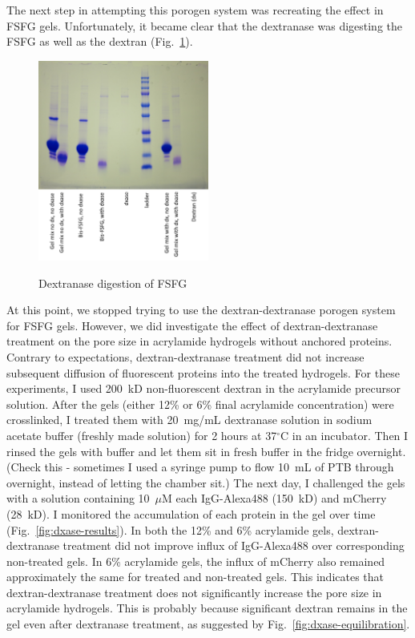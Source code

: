 The next step in attempting this porogen system was recreating the effect in FSFG gels.  Unfortunately, it became clear that the dextranase was digesting the FSFG as well as the dextran (Fig.~\ref{fig:dxase-FSFG}).  
\begin{figure} %
\caption{Dextranase digestion of FSFG}
\centering
\includegraphics[width=0.5\textwidth]{figs/ch03/180619_LKM_dx+FSFG}
\label{fig:dxase-FSFG}
\end{figure}
 At this point, we stopped trying to use the dextran-dextranase porogen system for FSFG gels.  However, we did investigate the effect of dextran-dextranase treatment on the pore size in acrylamide hydrogels without anchored proteins.  Contrary to expectations, dextran-dextranase treatment did not increase subsequent diffusion of fluorescent proteins into the treated hydrogels.  For these experiments, I used 200~kD non-fluorescent dextran in the acrylamide precursor solution.  After the gels (either 12\% or 6\% final acrylamide concentration) were crosslinked, I treated them with 20~mg/mL dextranase solution in sodium acetate buffer (freshly made solution) for 2 hours at 37$^\circ$C in an incubator.  Then I rinsed the gels with buffer and let them sit in fresh buffer in the fridge overnight.  (Check this - sometimes I used a syringe pump to flow 10~mL of PTB through overnight, instead of letting the chamber sit.) The next day, I challenged the gels with a solution containing 10~$\mu$M each IgG-Alexa488 (150~kD) and mCherry (28~kD).  I monitored the accumulation of each protein in the gel over time (Fig.~\ref{fig:dxase-results}).  In both the 12\% and 6\% acrylamide gels, dextran-dextranase treatment did not improve influx of IgG-Alexa488 over corresponding non-treated gels.  In 6\% acrylamide gels, the influx of mCherry also remained approximately the same for treated and non-treated gels.  This indicates that dextran-dextranase treatment does not significantly increase the pore size in acrylamide hydrogels.  This is probably because significant dextran remains in the gel even after dextranase treatment, as suggested by Fig.~\ref{fig:dxase-equilibration}.
